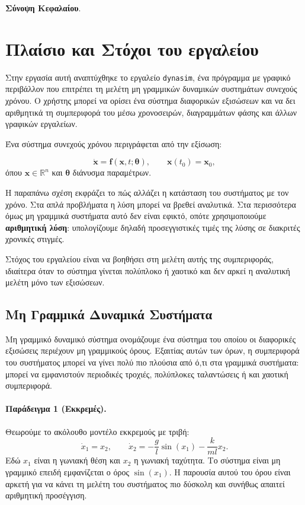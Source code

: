 \documentclass[11pt,a4paper]{report}
\newcommand{\params}{\symbf{\theta}}
\begin{document}
\noindent\textbf{Σύνοψη Κεφαλαίου}.
\textenglish{}

\vspace{8pt}

\section{Πλαίσιο και Στόχοι του εργαλείου}
\label{sec:tool-context-goals}

Στην εργασία αυτή αναπτύχθηκε το εργαλείο \texttt{dynasim}, ένα πρόγραμμα με
γραφικό περιβάλλον που επιτρέπει τη μελέτη μη γραμμικών δυναμικών συστημάτων
συνεχούς χρόνου. Ο χρήστης μπορεί να ορίσει ένα σύστημα διαφορικών εξισώσεων
και να δει αριθμητικά τη συμπεριφορά του μέσω χρονοσειρών, διαγραμμάτων φάσης
και άλλων γραφικών εργαλείων.

Ένα σύστημα συνεχούς χρόνου περιγράφεται από την εξίσωση:

\begin{equation}
\dot{\mathbf{x}}=\mathbf{f}(\mathbf{x},t;\params),
\qquad
\mathbf{x}(t_0)=\mathbf{x}_0,
\end{equation}
όπου $\mathbf{x}\in\mathbb{R}^n$ και $\params$ διάνυσμα παραμέτρων.

Η παραπάνω σχέση εκφράζει το πώς αλλάζει η κατάσταση του συστήματος με τον
χρόνο. Στα απλά προβλήματα η λύση μπορεί να βρεθεί αναλυτικά. Στα περισσότερα
όμως μη γραμμικά συστήματα αυτό δεν είναι εφικτό, οπότε χρησιμοποιούμε
\textbf{αριθμητική λύση}: υπολογίζουμε δηλαδή προσεγγιστικές τιμές της λύσης
σε διακριτές χρονικές στιγμές.

Στόχος του εργαλείου είναι να βοηθήσει στη μελέτη αυτής της συμπεριφοράς,
ιδιαίτερα όταν το σύστημα γίνεται πολύπλοκο ή χαοτικό και δεν αρκεί η
αναλυτική μελέτη μόνο των εξισώσεων.

 \subsection{Μη Γραμμικά Δυναμικά Συστήματα}
\label{subsec:nonlinear-dynamical-systems}

Μη γραμμικό δυναμικό σύστημα ονομάζουμε ένα σύστημα του οποίου οι διαφορικές
εξισώσεις περιέχουν μη γραμμικούς όρους. Εξαιτίας αυτών των όρων, η
συμπεριφορά του συστήματος μπορεί να γίνει πολύ πιο πλούσια από ό,τι στα
γραμμικά συστήματα: μπορεί να εμφανιστούν περιοδικές τροχιές, πολύπλοκες
ταλαντώσεις ή και χαοτική συμπεριφορά.

\paragraph{Παράδειγμα 1 (Εκκρεμές).}
Θεωρούμε το ακόλουθο μοντέλο εκκρεμούς με τριβή:
\[
\dot{x}_1 = x_2,\qquad
\dot{x}_2 = -\frac{g}{l}\sin(x_1) - \frac{k}{ml}x_2.
\]
Εδώ $x_1$ είναι η γωνιακή θέση και $x_2$ η γωνιακή ταχύτητα. Το σύστημα είναι
μη γραμμικό επειδή εμφανίζεται ο όρος $\sin(x_1)$. Η παρουσία αυτού του όρου
είναι αρκετή για να κάνει τη μελέτη του συστήματος πιο δύσκολη και συνήθως
απαιτεί αριθμητική προσέγγιση.
\end{document}
